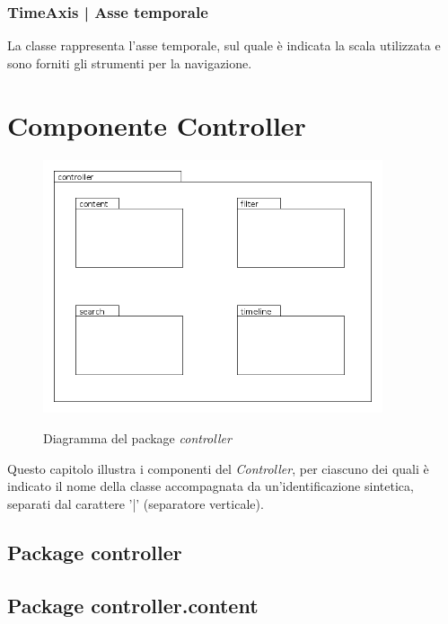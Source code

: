 \documentclass[10pt,a4paper,headinclude,footinclude,hidelinks]{scrreprt} %
\begin{document}
	\subsection[TimeAxis]{TimeAxis | Asse temporale}
	\label{sec:stage:design:sistema:view.timeline:time-axis}
	La classe \textit{} rappresenta l'asse temporale, sul quale è indicata la scala utilizzata e sono forniti gli strumenti per la navigazione. 

	\chapter{Componente Controller}
	\label{ch:stage:design:controller}

	\begin{figure}[ht]
		\begin{center}
	    	\includegraphics[width=10cm]{package/controller.png}
			\label{gfx:package:controller}
			\caption{Diagramma del package \textit{controller}}
		\end{center}
	\end{figure}

	Questo capitolo illustra i componenti del \textit{Controller}, per ciascuno dei quali è indicato il nome della classe accompagnata da un'identificazione sintetica, separati dal carattere '|' (separatore verticale).

	\section{Package controller}
	\label{ch:stage:design:sistema:controller}

	\section{Package controller.content}
	\label{ch:stage:design:sistema:controller.content}
\end{document}
